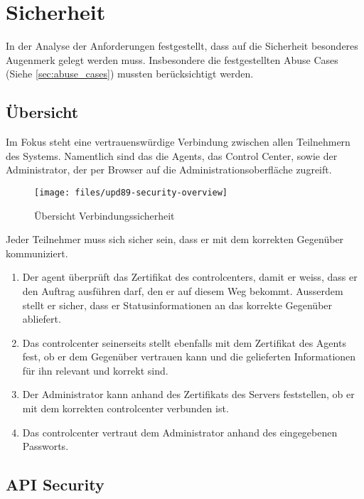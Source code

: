 \section{Sicherheit}

In der Analyse der Anforderungen festgestellt, dass auf die Sicherheit besonderes Augenmerk gelegt werden muss. Insbesondere die festgestellten Abuse Cases (Siehe \ref{sec:abuse_cases}) mussten berücksichtigt werden.

\subsection*{Übersicht}

Im Fokus steht eine vertrauenswürdige Verbindung zwischen allen Teilnehmern des Systems. Namentlich sind das die Agents, das Control Center, sowie der Administrator, der per Browser auf die Administrationsoberfläche zugreift.

\begin{figure}
  \centering
    \texttt{[image: files/upd89-security-overview]}
  \caption{Übersicht Verbindungssicherheit}
  \label{fig:sec-overview}
\end{figure}

Jeder Teilnehmer muss sich sicher sein, dass er mit dem korrekten Gegenüber kommuniziert.

\begin{enumerate}[label=\color{orange}\theenumi]
    \item Der \gls{agent} überprüft das Zertifikat des \glspl{controlcenter}, damit er weiss, dass er den Auftrag ausführen darf, den er auf diesem Weg bekommt. Ausserdem stellt er sicher, dass er Statusinformationen an das korrekte Gegenüber abliefert.
    \item Das \gls{controlcenter} seinerseits stellt ebenfalls mit dem Zertifikat des Agents fest, ob er dem Gegenüber vertrauen kann und die gelieferten Informationen für ihn relevant und korrekt sind.
    \item Der Administrator kann anhand des Zertifikats des Servers feststellen, ob er mit dem korrekten \gls{controlcenter} verbunden ist.
    \item Das \gls{controlcenter} vertraut dem Administrator anhand des eingegebenen Passworts.
\end{enumerate}

\subsection*{API Security}

